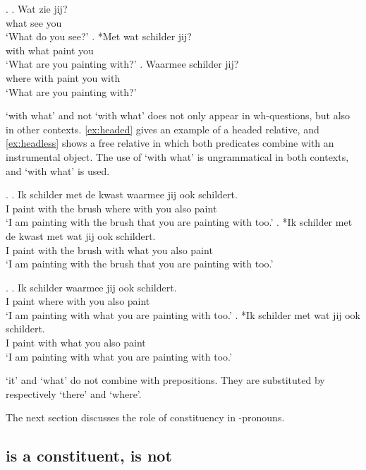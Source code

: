 \documentclass[12pt]{article}
\begin{document}
\ex.
\ag. Wat zie jij?\\
 what see you\\
 `What do you see?'\label{ex:wat}
\bg. *Met wat schilder jij?\\
 with what paint you\\
 `What are you painting with?'\label{ex:metwat}
\bg. Waarmee schilder jij?\\
 {where with} paint you with\\
 `What are you painting with?'\label{ex:waarmee}

 `with what' and not  `with what' does not only appear in wh-questions, but also in other contexts. \ref{ex:headed} gives an example of a headed relative, and \ref{ex:headless} shows a free relative in which both predicates combine with an instrumental object. The use of  `with what' is ungrammatical in both contexts, and  `with what' is used.

\ex.\label{ex:headed}
\ag. Ik schilder met de kwast waarmee jij ook schildert.\\
 I paint with the brush {where with} you also paint\\
 `I am painting with the brush that you are painting with too.'
\bg. *Ik schilder met de kwast met wat jij ook schildert.\\
 I paint with the brush with what you also paint\\
 `I am painting with the brush that you are painting with too.'

 \ex.\label{ex:headless}
 \ag. Ik schilder waarmee jij ook schildert.\\
  I paint {where with} you also paint\\
  `I am painting with what you are painting with too.'
 \bg. *Ik schilder met wat jij ook schildert.\\
  I paint with what you also paint\\
  `I am painting with what you are painting with too.'

 `it' and  `what' do not combine with prepositions. They are substituted by respectively  `there' and  `where'.

The next section discusses the role of constituency in -pronouns.


\subsection{ is a constituent,  is not}
\end{document}
